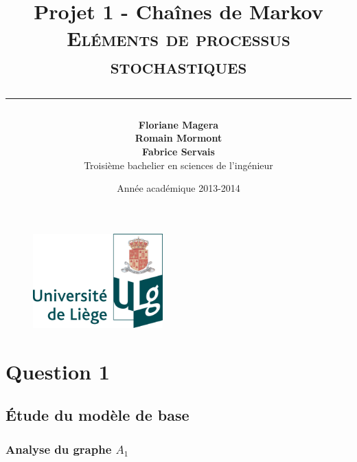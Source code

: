 \documentclass[a4paper,titlepage]{report}
\begin{document}
\begin{titlepage}

\begin{figure}
\centering
\includegraphics[width=5cm]{logo-ulg.png}
\end{figure}



\title{
\vspace{0.2cm}
\LARGE{\textbf{Projet 1 - Chaînes de Markov}} \\ \textsc{Eléments de processus stochastiques}
\author{\textbf{Floriane Magera} \\ \textbf{Romain Mormont} \\ \textbf{Fabrice Servais}\\ Troisième bachelier en sciences de l'ingénieur}
\date{Année académique 2013-2014}
\rule{15cm}{1.5pt}
}

\end{titlepage}

\pagestyle{fancy}

\maketitle
\newpage
\tableofcontents
\newpage
\chapter{Question 1}
\section{Étude du modèle de base}
\subsection*{Analyse du graphe $A_1$}
\end{document}
